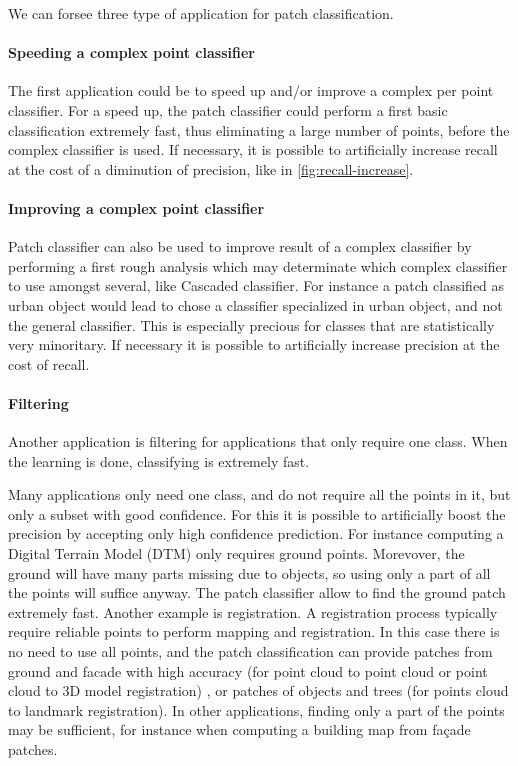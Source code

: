 			We can forsee three type of application for patch classification.
			
			\paragraph{Speeding a complex point classifier}
				The first application could be to speed up and/or improve a complex per point classifier.
				For a speed up, the patch classifier could perform a first basic classification extremely fast, thus eliminating a large number of points, before the complex classifier is used. 
				If necessary, it is possible to artificially increase recall at the cost of a diminution of precision, like in \ref{fig:recall-increase}.
				 
				
			\paragraph{Improving a complex point classifier}
				Patch classifier can also be used to improve result of a complex classifier by performing a first rough analysis which may determinate which complex classifier to use amongst several, like Cascaded classifier.
				For instance a patch classified as urban object would lead to chose a classifier specialized in urban object, and not the general classifier. This is especially precious for classes that are statistically very minoritary.
				If necessary it is possible to artificially increase precision at the cost of recall.
				
				
				
			\paragraph{Filtering}
				Another application is filtering for applications that only require one class. When the learning is done, classifying is extremely fast.
				
				Many applications only need one class, and do not require all the points in it, but only a subset with good confidence.
				For this it is possible to artificially boost the precision by accepting only high confidence prediction.
				For instance computing a Digital Terrain Model (DTM) only requires ground points. Morevover, the ground will have many parts missing due to objects, so using only a part of all the points will suffice anyway. The patch classifier allow to find the ground patch extremely fast.
				Another example is registration. A registration process typically require reliable points to perform mapping and registration. In this case there is no need to use all points, and the patch classification can provide patches from ground and facade with high accuracy (for point cloud to point cloud or point cloud to 3D model registration) , or patches of objects and trees (for points cloud to landmark registration).
				In other applications, finding only a part of the points may be sufficient, for instance when computing a building map from façade patches.
				  
